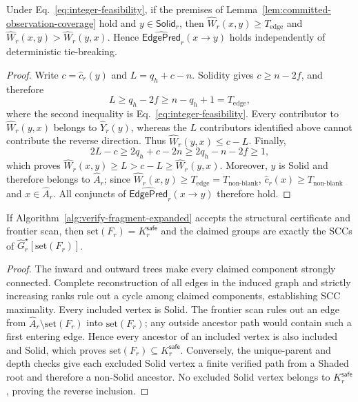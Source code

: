 \begin{lemma}
\label{lem:fair-edge-formation}
Under Eq.~\eqref{eq:integer-feasibility}, if the premises of
Lemma~\ref{lem:committed-observation-coverage} hold and
$y\in\mathsf{Solid}_r$, then
$\widehat W_r(x,y)\ge T_{\mathrm{edge}}$ and
$\widehat W_r(x,y)>\widehat W_r(y,x)$.  Hence
$\widehat{\mathsf{EdgePred}}_r(x\to y)$ holds independently
of deterministic tie-breaking.
\end{lemma}

\begin{proof}
Write $c=\widehat c_r(y)$ and $L=q_h+c-n$.  Solidity gives
$c\ge n-2f$, and therefore
\[
 L\ge q_h-2f\ge n-q_h+1=T_{\mathrm{edge}},
\]
where the second inequality is Eq.~\eqref{eq:integer-feasibility}.  Every
contributor to $\widehat W_r(y,x)$ belongs to $\widehat Y_r(y)$, whereas the $L$ contributors
identified above cannot contribute the reverse direction.  Thus
$\widehat W_r(y,x)\le c-L$.  Finally,
\[
 2L-c\ge2q_h+c-2n\ge2q_h-n-2f\ge1,
\]
which proves
$\widehat W_r(x,y)\ge L>c-L\ge\widehat W_r(y,x)$.  Moreover, $y$ is Solid and
therefore belongs to $\widehat A_r$; since
$\widehat W_r(x,y)\ge T_{\mathrm{edge}}=T_{\mathrm{non\mbox{-}blank}}$,
$\widehat c_r(x)\ge T_{\mathrm{non\mbox{-}blank}}$ and
$x\in\widehat A_r$.  All conjuncts of
$\widehat{\mathsf{EdgePred}}_r(x\to y)$ therefore
hold.
\end{proof}

\begin{lemma}
\label{lem:safe-closure-certificate}
If Algorithm~\ref{alg:verify-fragment-expanded} accepts the structural certificate and
frontier scan, then $\mathrm{set}(F_r)=K_r^{\mathsf{safe}}$ and the claimed
groups are exactly the SCCs of
$\widehat G_r^\star[\mathrm{set}(F_r)]$.
\end{lemma}

\begin{proof}
The inward and outward trees make every claimed component strongly connected.
Complete reconstruction of all edges in the induced graph and strictly increasing ranks
rule out a cycle among claimed components, establishing SCC maximality.  Every
included vertex is Solid.  The frontier scan rules out an edge from
$\widehat A_r\setminus\mathrm{set}(F_r)$ into $\mathrm{set}(F_r)$; any outside
ancestor path would contain such a first entering edge.  Hence every ancestor
of an included vertex is also included and Solid,
which proves $\mathrm{set}(F_r)\subseteq K_r^{\mathsf{safe}}$.  Conversely, the
unique-parent and depth checks give each excluded Solid vertex a finite
verified path from a Shaded root and therefore a non-Solid ancestor.  No
excluded Solid vertex belongs to
$K_r^{\mathsf{safe}}$, proving the reverse inclusion.
\end{proof}


